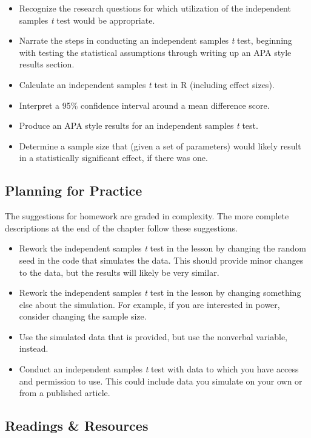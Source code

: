 \documentclass[
  11pt,
]{book}
\providecommand{\tightlist}{%
  \setlength{\itemsep}{0pt}\setlength{\parskip}{0pt}}
\begin{document}
\begin{itemize}
\tightlist
\item
  Recognize the research questions for which utilization of the independent samples \emph{t} test would be appropriate.
\item
  Narrate the steps in conducting an independent samples \emph{t} test, beginning with testing the statistical assumptions through writing up an APA style results section.
\item
  Calculate an independent samples \emph{t} test in R (including effect sizes).
\item
  Interpret a 95\% confidence interval around a mean difference score.
\item
  Produce an APA style results for an independent samples \emph{t} test.
\item
  Determine a sample size that (given a set of parameters) would likely result in a statistically significant effect, if there was one.
\end{itemize}

\hypertarget{planning-for-practice-2}{%
\subsection{Planning for Practice}\label{planning-for-practice-2}}

The suggestions for homework are graded in complexity. The more complete descriptions at the end of the chapter follow these suggestions.

\begin{itemize}
\tightlist
\item
  Rework the independent samples \emph{t} test in the lesson by changing the random seed in the code that simulates the data. This should provide minor changes to the data, but the results will likely be very similar.
\item
  Rework the independent samples \emph{t} test in the lesson by changing something else about the simulation. For example, if you are interested in power, consider changing the sample size.
\item
  Use the simulated data that is provided, but use the nonverbal variable, instead.
\item
  Conduct an independent samples \emph{t} test with data to which you have access and permission to use. This could include data you simulate on your own or from a published article.
\end{itemize}

\hypertarget{readings-resources-2}{%
\subsection{Readings \& Resources}\label{readings-resources-2}}
\end{document}
